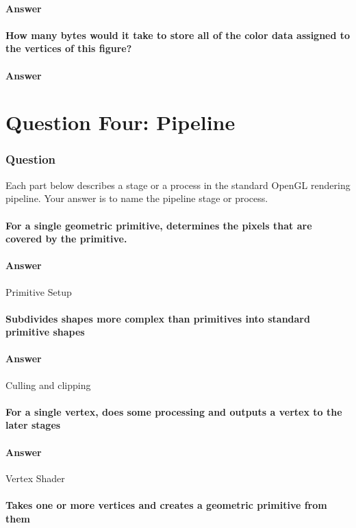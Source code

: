 \documentclass{report}
\begin{document}
\subsection{Answer}
\subsection{ How many bytes would it take to store all of the color data assigned to the vertices of this figure?}
\subsection{Answer}
\part{Question Four: Pipeline}
\section{Question}
Each part below describes a stage or a process in the standard OpenGL rendering pipeline. Your answer is to name the pipeline stage or process.
\subsection{ For a single geometric primitive, determines the pixels that are covered by the primitive.}
\subsection{Answer}
Primitive Setup
\subsection{ Subdivides shapes more complex than primitives into standard primitive shapes}
\subsection{Answer}
Culling and clipping
\subsection{ For a single vertex, does some processing and outputs a vertex to the later stages}
\subsection{Answer}
Vertex Shader
\subsection{ Takes one or more vertices and creates a geometric primitive from them}
\end{document}
